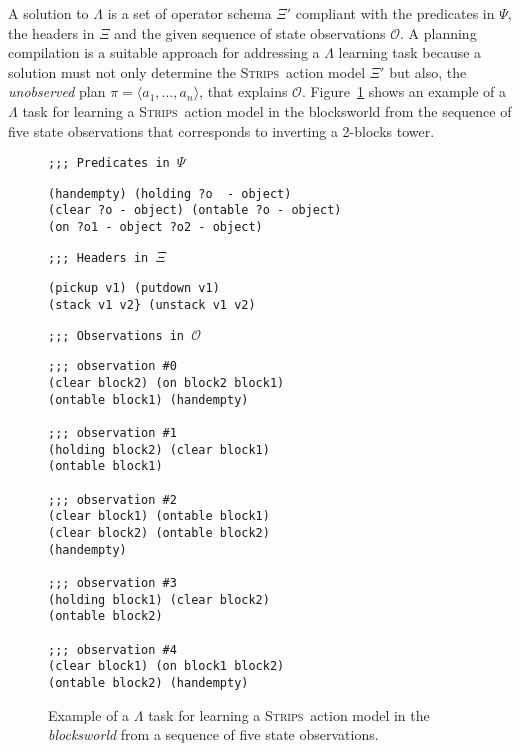 \documentclass{article}
\newcommand{\tup}[1]{{\langle #1 \rangle}}
\newcommand{\strips}{\textsc{Strips}}     %
\begin{document}
A solution to $\Lambda$ is a set of operator schema $\Xi'$ compliant with the predicates in $\Psi$, the headers in $\Xi$ and the given sequence of state observations $\mathcal{O}$. A planning compilation is a suitable approach for addressing a $\Lambda$ learning task because a solution must not only determine the \strips\ action model $\Xi'$ but also, the {\em unobserved} plan $\pi=\tup{a_1, \ldots, a_n}$, that explains $\mathcal{O}$. Figure~\ref{fig:lexample} shows an example of a $\Lambda$ task for learning a \strips\ action model in the blocksworld from the sequence of five state observations that corresponds to inverting a 2-blocks tower.

\begin{figure}[hbt!]
{\footnotesize\tt ;;; Predicates in $\Psi$}
\begin{footnotesize}
\begin{verbatim}
(handempty) (holding ?o  - object)
(clear ?o - object) (ontable ?o - object)
(on ?o1 - object ?o2 - object)
\end{verbatim}
\end{footnotesize}
\vspace{0.2cm}
{\footnotesize\tt ;;; Headers in $\Xi$}
\begin{footnotesize}
\begin{verbatim}
(pickup v1) (putdown v1)
(stack v1 v2} (unstack v1 v2)
\end{verbatim}
\end{footnotesize}
\vspace{0.2cm}
{\footnotesize\tt ;;; Observations in $\mathcal{O}$}
\begin{footnotesize}
\begin{verbatim}
;;; observation #0
(clear block2) (on block2 block1)
(ontable block1) (handempty)

;;; observation #1
(holding block2) (clear block1)
(ontable block1)

;;; observation #2
(clear block1) (ontable block1)
(clear block2) (ontable block2)
(handempty)

;;; observation #3
(holding block1) (clear block2)
(ontable block2)

;;; observation #4
(clear block1) (on block1 block2)
(ontable block2) (handempty)
\end{verbatim}
\end{footnotesize}
 \caption{\small Example of a $\Lambda$ task for learning a \strips\ action model in the {\em blocksworld} from a sequence of five state observations.}
\label{fig:lexample}
\end{figure}
\end{document}
